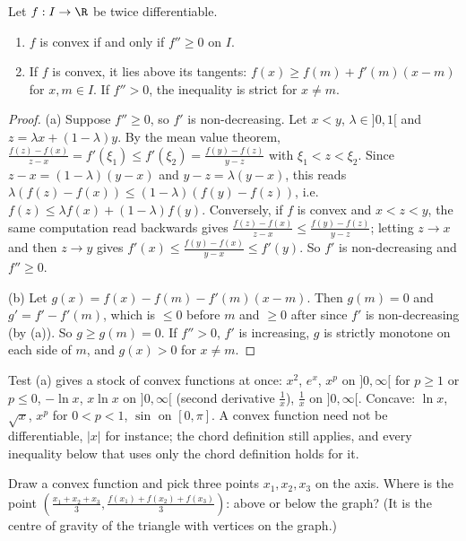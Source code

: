 \begin{proposition}\label{prop:convex}
Let $f:I\to\R$ be twice differentiable.
\begin{enumerate}[label=(\alph*)]
\item $f$ is convex if and only if $f''\ge0$ on $I$.
\item If $f$ is convex, it lies above its tangents: $f(x)\ge f(m)+f'(m)(x-m)$ for $x,m\in I$. If $f''>0$, the inequality is strict for $x\ne m$.
\end{enumerate}
\end{proposition}
\begin{proof}
(a) Suppose $f''\ge0$, so $f'$ is non-decreasing. Let $x<y$, $\lambda\in]0,1[$ and $z=\lambda x+(1-\lambda)y$. By the mean value theorem, $\frac{f(z)-f(x)}{z-x}=f'(\xi_1)\le f'(\xi_2)=\frac{f(y)-f(z)}{y-z}$ with $\xi_1<z<\xi_2$. Since $z-x=(1-\lambda)(y-x)$ and $y-z=\lambda(y-x)$, this reads $\lambda(f(z)-f(x))\le(1-\lambda)(f(y)-f(z))$, i.e.\ $f(z)\le\lambda f(x)+(1-\lambda)f(y)$.
Conversely, if $f$ is convex and $x<z<y$, the same computation read backwards gives $\frac{f(z)-f(x)}{z-x}\le\frac{f(y)-f(z)}{y-z}$; letting $z\to x$ and then $z\to y$ gives $f'(x)\le\frac{f(y)-f(x)}{y-x}\le f'(y)$. So $f'$ is non-decreasing and $f''\ge0$.

(b) Let $g(x)=f(x)-f(m)-f'(m)(x-m)$. Then $g(m)=0$ and $g'=f'-f'(m)$, which is $\le0$ before $m$ and $\ge0$ after since $f'$ is non-decreasing (by (a)). So $g\ge g(m)=0$. If $f''>0$, $f'$ is increasing, $g$ is strictly monotone on each side of $m$, and $g(x)>0$ for $x\ne m$.
\end{proof}

\begin{examplex}
Test (a) gives a stock of convex functions at once: $x^2$, $e^x$, $x^p$ on $]0,\infty[$ for $p\ge1$ or $p\le0$, $-\ln x$, $x\ln x$ on
$]0,\infty[$ (second derivative $\frac1x$), $\frac1x$ on $]0,\infty[$. Concave: $\ln x$, $\sqrt x$, $x^p$ for $0<p<1$, $\sin$ on $[0,\pi]$. A convex
function need not be differentiable, $|x|$ for instance; the chord definition still applies, and every inequality below that uses only the chord
definition holds for it.
\end{examplex}

\begin{think}
Draw a convex function and pick three points $x_1,x_2,x_3$ on the axis. Where is the point $\left(\frac{x_1+x_2+x_3}3,\frac{f(x_1)+f(x_2)+f(x_3)}3\right)$: above or below the graph? (It is the centre of gravity of the triangle with vertices on the graph.)
\end{think}

